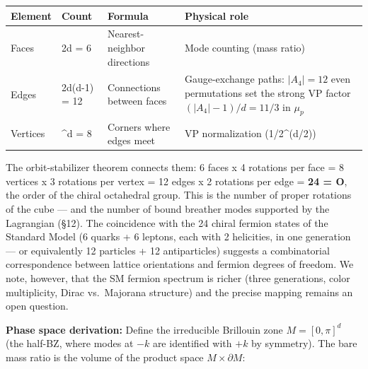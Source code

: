 \documentclass[
]{article}
\newcounter{none} %
\begin{document}
{\def\LTcaptype{none} %
\begin{longtable}[]{@{}
  >{\raggedright\arraybackslash}p{}
  >{\raggedright\arraybackslash}p{}
  >{\raggedright\arraybackslash}p{}
  >{\raggedright\arraybackslash}p{}@{}}
\toprule\noalign{}
\begin{minipage}[b]{\linewidth}\raggedright
Element
\end{minipage} & \begin{minipage}[b]{\linewidth}\raggedright
Count
\end{minipage} & \begin{minipage}[b]{\linewidth}\raggedright
Formula
\end{minipage} & \begin{minipage}[b]{\linewidth}\raggedright
Physical role
\end{minipage} \\
\midrule\noalign{}
\endhead
\bottomrule\noalign{}
\endlastfoot
Faces & 2d = 6 & Nearest-neighbor directions & Mode counting (mass
ratio) \\
Edges & 2d(d-1) = 12 & Connections between faces & Gauge-exchange paths:
\(|A_4| = 12\) even permutations set the strong VP factor
\((|A_4|-1)/d = 11/3\) in \(\mu_p\) \\
Vertices & 2\^{}d = 8 & Corners where edges meet & VP normalization
(1/2\^{}(d/2)) \\
\end{longtable}
}

The orbit-stabilizer theorem connects them: 6 faces x 4 rotations per
face = 8 vertices x 3 rotations per vertex = 12 edges x 2 rotations per
edge = \textbf{24 = \textbar O\textbar{}}, the order of the chiral
octahedral group. This is the number of proper rotations of the cube ---
and the number of bound breather modes supported by the Lagrangian
(§12). The coincidence with the 24 chiral fermion states of the Standard
Model (6 quarks + 6 leptons, each with 2 helicities, in one generation
--- or equivalently 12 particles + 12 antiparticles) suggests a
combinatorial correspondence between lattice orientations and fermion
degrees of freedom. We note, however, that the SM fermion spectrum is
richer (three generations, color multiplicity, Dirac vs.~Majorana
structure) and the precise mapping remains an open question.

\textbf{Phase space derivation:} Define the irreducible Brillouin zone
\(M = [0,\pi]^d\) (the half-BZ, where modes at \(-k\) are identified
with \(+k\) by symmetry). The bare mass ratio is the volume of the
product space \(M \times \partial M\):
\end{document}
